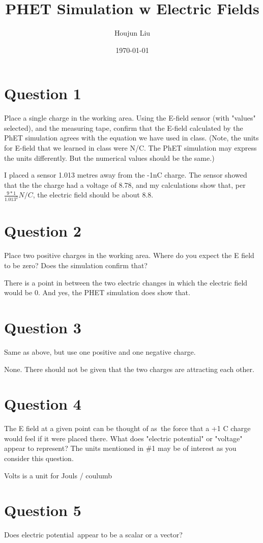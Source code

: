 \documentclass[letterpaper]{article}
\author{Houjun Liu}
\date{\today}
\title{PHET Simulation w Electric Fields}
\renewcommand{\tableofcontents}{}
\begin{document}
\tableofcontents



\section{Question 1}
\label{sec:org22d0f57}
Place a single charge in the working area. Using the E-field sensor
(with "values" selected), and the measuring tape, confirm that the
E-field calculated by the PhET simulation agrees with the equation we
have used in class. (Note, the units for E-field that we learned in
class were N/C. The PhET simulation may express the units differently.
But the numerical values should be the same.)

I placed a sensor 1.013 metres away from the -1nC charge. The sensor
showed that the the charge had a voltage of 8.78, and my calculations
show that, per \(\frac{9*1}{1.013^2} N/C\), the electric field should be
about 8.8.

\section{Question 2}
\label{sec:orgfad32a3}
Place two positive charges in the working area. Where do you expect the
E field to be zero? Does the simulation confirm that?

There is a point in between the two electric changes in which the
electric field would be 0. And yes, the PHET simulation does show that.

\section{Question 3}
\label{sec:org5aa69f2}
Same as above, but use one positive and one negative charge.

None. There should not be given that the two charges are attracting each
other.

\section{Question 4}
\label{sec:org699d456}
The E field at a given point can be thought of as the force that a +1 C
charge would feel if it were placed there. What does "electric
potential" or "voltage" appear to represent? The units mentioned in \#1
may be of interest as you consider this question.

Volts is a unit for Jouls / coulumb

\section{Question 5}
\label{sec:org40df82b}
Does electric potential appear to be a scalar or a vector?
\end{document}
